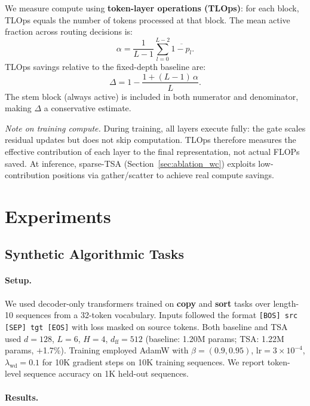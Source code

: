 \documentclass{article}
\newcommand{\tsa}{TSA\xspace}
\newcommand{\tlops}{TLOps\xspace}
\begin{document}
We measure compute using \textbf{token-layer operations (\tlops)}: for each block,
\tlops equals the number of tokens processed at that block. The mean active fraction
across routing decisions is:
\begin{equation}
  \alpha = \frac{1}{L-1} \sum_{l=0}^{L-2} \overline{1-p_l}.
\end{equation}
\tlops savings relative to the fixed-depth baseline are:
\begin{equation}
  \Delta = 1 - \frac{1 + (L-1)\,\alpha}{L}.
\end{equation}
The stem block (always active) is included in both numerator and denominator,
making $\Delta$ a conservative estimate.

\emph{Note on training compute.} During training, all layers execute fully: the gate
scales residual updates but does not skip computation. \tlops therefore measures the
effective contribution of each layer to the final representation, not actual FLOPs
saved. At inference, sparse-TSA (Section~\ref{sec:ablation_wc}) exploits
low-contribution positions via gather/scatter to achieve real compute savings.

\section{Experiments}

\subsection{Synthetic Algorithmic Tasks}
\label{sec:synth}

\paragraph{Setup.}
We used decoder-only transformers trained on \textbf{copy} and \textbf{sort} tasks
over length-10 sequences from a 32-token vocabulary. Inputs followed the format
\texttt{[BOS] src [SEP] tgt [EOS]} with loss masked on source tokens. Both baseline
and \tsa used $d{=}128$, $L{=}6$, $H{=}4$, $d_\mathrm{ff}{=}512$ (baseline:
1.20M params; \tsa: 1.22M params, $+$1.7\%). Training employed AdamW
\citep{loshchilov2019adamw} with $\beta{=}(0.9,0.95)$, $\mathrm{lr}{=}3{\times}10^{-4}$,
$\lambda_\mathrm{wd}{=}0.1$ for 10K gradient steps on 10K training sequences.
We report token-level sequence accuracy on 1K held-out sequences.

\paragraph{Results.}
\end{document}

